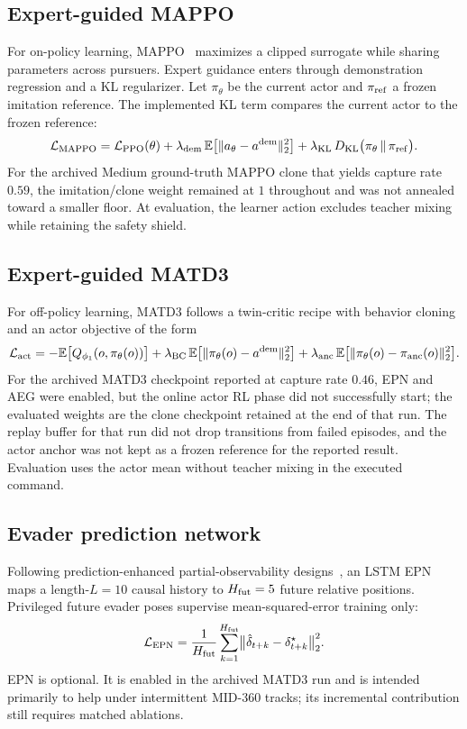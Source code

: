 \documentclass{SCIS2026}
\begin{document}
\subsection{Expert-guided MAPPO}
For on-policy learning, MAPPO~\cite{yu2022} maximizes a clipped surrogate while sharing parameters across pursuers. Expert guidance enters through demonstration regression and a KL regularizer. Let $\pi_\theta$ be the current actor and $\pi_{\rm ref}$ a frozen imitation reference. The implemented KL term compares the current actor to the frozen reference:
\begin{equation}
\mathcal{L}_{\rm MAPPO}=\mathcal{L}_{\rm PPO}(\theta)+\lambda_{\rm dem}\,\mathbb{E}\bigl[\|a_\theta-a^{\rm dem}\|_2^2\bigr]+\lambda_{\rm KL}\,D_{\rm KL}\bigl(\pi_\theta\,\|\,\pi_{\rm ref}\bigr).
\label{eq:mappo}
\end{equation}
For the archived Medium ground-truth MAPPO clone that yields capture rate $0.59$, the imitation/clone weight remained at $1$ throughout and was not annealed toward a smaller floor. At evaluation, the learner action excludes teacher mixing while retaining the safety shield.

\subsection{Expert-guided MATD3}
For off-policy learning, MATD3 follows a twin-critic recipe with behavior cloning and an actor objective of the form
\begin{equation}
\mathcal{L}_{\rm act}=-\mathbb{E}\bigl[Q_{\phi_1}(o,\pi_\theta(o))\bigr]+\lambda_{\rm BC}\,\mathbb{E}\bigl[\|\pi_\theta(o)-a^{\rm dem}\|_2^2\bigr]+\lambda_{\rm anc}\,\mathbb{E}\bigl[\|\pi_\theta(o)-\pi_{\rm anc}(o)\|_2^2\bigr].
\label{eq:matd3}
\end{equation}
For the archived MATD3 checkpoint reported at capture rate $0.46$, EPN and AEG were enabled, but the online actor RL phase did not successfully start; the evaluated weights are the clone checkpoint retained at the end of that run. The replay buffer for that run did not drop transitions from failed episodes, and the actor anchor was not kept as a frozen reference for the reported result. Evaluation uses the actor mean without teacher mixing in the executed command.

\subsection{Evader prediction network}
\label{sec:epn}
Following prediction-enhanced partial-observability designs~\cite{open2024}, an LSTM EPN maps a length-$L=10$ causal history to $H_{\rm fut}=5$ future relative positions. Privileged future evader poses supervise mean-squared-error training only:
\begin{equation}
\mathcal{L}_{\rm EPN}=\frac{1}{H_{\rm fut}}\sum_{k=1}^{H_{\rm fut}}\bigl\|\hat\delta_{t+k}-\delta^{\star}_{t+k}\bigr\|_2^2.
\label{eq:epn}
\end{equation}
EPN is optional. It is enabled in the archived MATD3 run and is intended primarily to help under intermittent MID-360 tracks; its incremental contribution still requires matched ablations.
\end{document}
